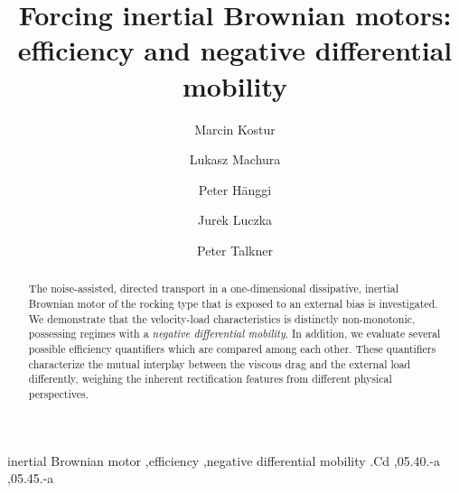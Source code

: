 \documentclass{elsart}
\begin{document}
\begin{frontmatter}

\title{
    Forcing inertial Brownian motors: efficiency and negative differential mobility
     }
%
\author[a]{Marcin Kostur}
  \author[a,b]{Lukasz Machura}
   \author[a]{Peter
    H\"anggi} \author[b]{Jurek Luczka} \author[a]{Peter Talkner}
  \address[a]{Institute of Physics, University of Augsburg,
    Universit\"atsstrasse 1, D-86135 Augsburg, Germany}
  \address[b]{Institute of Physics, University of Silesia, P-40-007
    Katowice, Poland}

\begin{abstract}
  The noise-assisted, directed transport in a one-dimensional dissipative, inertial
  Brownian motor of the rocking type that is exposed to an external
  bias is investigated. We demonstrate that the velocity-load
  characteristics is distinctly non-monotonic, possessing regimes with
  a {\em negative differential mobility}.  In addition, we evaluate
  several possible efficiency quantifiers which are compared among
  each other. These quantifiers characterize the mutual interplay
  between the viscous drag and the external load differently, weighing
  the inherent rectification features from different physical
  perspectives.
\end{abstract}

\begin{keyword}
  inertial Brownian motor \sep efficiency \sep negative differential
  mobility .Cd \sep 05.40.-a \sep 05.45.-a
\end{keyword}

\end{frontmatter}
\end{document}
